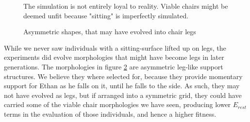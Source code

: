 \begin{figure}[ht]
	\centering
	 \hfil
	\caption{The simulation is not entirely loyal to reality. Viable chairs
	might be deemed unfit because "sitting" is imperfectly simulated.}
	\label{fig:footstools}
\end{figure}

\begin{figure}[h]
\centering
{}
\hfil
{}
\caption{Asymmetric shapes, that may have evolved into chair legs}
\label{fig:chair_legs}
\end{figure}

While we never saw individuals with a sitting-surface lifted up on legs, the
experiments did evolve morphologies that might have become legs in later
generations. The morphologies in figure \ref{fig:chair_legs} are asymmetric
leg-like support structures. We believe they where selected for, because they
provide momentary support for Ethan as he falls on it, until he falls to the
side. As such, they may not have evolved as legs, but if arranged into a
symmetric grid, they could have carried some of the viable chair morphologies we
have seen, producing lower $E_{rest}$ terms in the evaluation of those
individuals, and hence a higher fitness.
